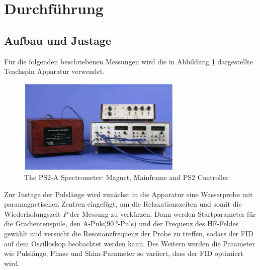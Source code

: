 \newpage
\section{Durchführung}
\label{sec:Durchführung}
\subsection{Aufbau und Justage}
Für die folgenden beschriebenen
Messungen wird die in Abbildung \ref{fig:teachspin}
dargestellte Teachspin Apparatur verwendet.
\FloatBarrier
\begin{figure}
  \includegraphics[width=0.7\textwidth]{teachspin.PNG}
  \caption{The PS2-A Spectrometer: Magnet, Mainframe and PS2 Controller}
  \label{fig:teachspin}
\end{figure}
\FloatBarrier
Zur Justage der Pulslänge wird zunächst
in die Apparatur eine Wasserprobe
mit paramagnetischen Zentren eingefügt, um
die Relaxationszeiten und somit die Wiederholungszeit $P$ der Messung zu verkürzen.
Dann werden Startparameter
für die Gradientenspule,
den A-Puls($\SI{90}{\degree}$-Puls)
und der Frequenz des HF-Feldes gewählt
und versucht die Resonanzfrequenz der Probe
zu treffen, sodass der FID auf dem Oszilloskop beobachtet werden kann. Des Weitern werden die
Parameter wie Pulslänge, Phase und Shim-Parameter so variiert, dass
der FID optimiert wird.
